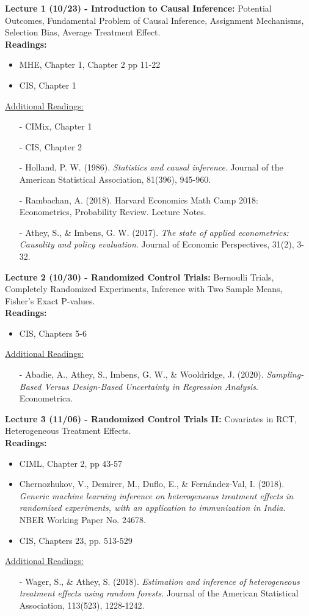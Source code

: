 \documentclass[12pt]{article}
\begin{document}
\textbf{Lecture 1 (10/23) - Introduction to Causal Inference:} Potential Outcomes, Fundamental Problem of Causal Inference, Assignment Mechanisms, Selection Bias, Average Treatment Effect.\\
\textbf{Readings:}
\begin{itemize}
    \item MHE, Chapter 1, Chapter 2 pp 11-22
    \item CIS, Chapter 1
\end{itemize}
\underline{Additional Readings:}
\begin{itemize}
    \item[-] CIMix, Chapter 1
    \item[-] CIS, Chapter 2
    \item[-] Holland, P. W. (1986). \emph{Statistics and causal inference}. Journal of the American Statistical Association, 81(396), 945-960.
    \item[-] Rambachan, A. (2018). Harvard Economics Math Camp 2018: Econometrics, Probability Review. Lecture Notes.
    \item[-] Athey, S., \& Imbens, G. W. (2017). \emph{The state of applied econometrics: Causality and policy evaluation}. Journal of Economic Perspectives, 31(2), 3-32.
\end{itemize}

\textbf{Lecture 2 (10/30) - Randomized Control Trials:} Bernoulli Trials, Completely Randomized Experiments, Inference with Two Sample Means, Fisher’s Exact P-values.\\
\textbf{Readings:}
\begin{itemize}
    \item CIS, Chapters 5-6
\end{itemize}
\underline{Additional Readings:}
\begin{itemize}
    \item[-] Abadie, A., Athey, S., Imbens, G. W., \& Wooldridge, J. (2020). \emph{Sampling-Based Versus Design-Based Uncertainty in Regression Analysis}. Econometrica.
\end{itemize}

\textbf{Lecture 3 (11/06) - Randomized Control Trials II:} Covariates in RCT, Heterogeneous Treatment Effects.\\
\textbf{Readings:}
\begin{itemize}
    \item CIML, Chapter 2, pp 43-57
    \item Chernozhukov, V., Demirer, M., Duflo, E., \& Fernández-Val, I. (2018). \emph{Generic machine learning inference on heterogeneous treatment effects in randomized experiments, with an application to immunization in India}. NBER Working Paper No. 24678.
    \item CIS, Chapters 23, pp. 513-529
\end{itemize}
\underline{Additional Readings:}
\begin{itemize}
    \item[-] Wager, S., \& Athey, S. (2018). \emph{Estimation and inference of heterogeneous treatment effects using random forests}. Journal of the American Statistical Association, 113(523), 1228-1242.
\end{itemize}
\end{document}
